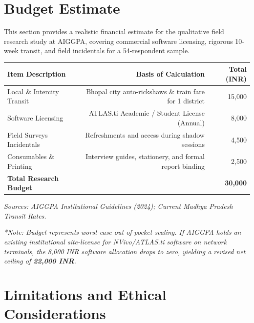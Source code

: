\documentclass[11pt,a4paper]{article}
\begin{document}
\section{Budget Estimate}

\vspace{0.2cm}
This section provides a realistic financial estimate for the qualitative field research study at AIGGPA, covering commercial software licensing, rigorous 10-week transit, and field incidentals for a 54-respondent sample.

\vspace{0.2cm}
\renewcommand{\arraystretch}{1.4}
\begin{tabularx}{\textwidth}{X r r}
\toprule
\textbf{Item Description} & \textbf{Basis of Calculation} & \textbf{Total (INR)} \\
\midrule
Local \& Intercity Transit & Bhopal city auto-rickshaws \& train fare for 1 district & 15,000 \\
Software Licensing & ATLAS.ti Academic / Student License (Annual) & 8,000 \\
Field Surveys Incidentals & Refreshments and access during shadow sessions & 4,500 \\
Consumables \& Printing & Interview guides, stationery, and formal report binding & 2,500 \\
\midrule
\textbf{Total Research Budget} & & \textbf{30,000} \\
\bottomrule
\end{tabularx}
\vspace{0.1cm}
\small\textit{Sources: AIGGPA Institutional Guidelines (2024); Current Madhya Pradesh Transit Rates.}

\vspace{0.1cm}
\small\textit{*Note: Budget represents worst-case out-of-pocket scaling. If AIGGPA holds an existing institutional site-license for NVivo/ATLAS.ti software on network terminals, the 8,000 INR software allocation drops to zero, yielding a revised net ceiling of \textbf{22,000 INR}.}

\section{Limitations and Ethical Considerations}
\end{document}

